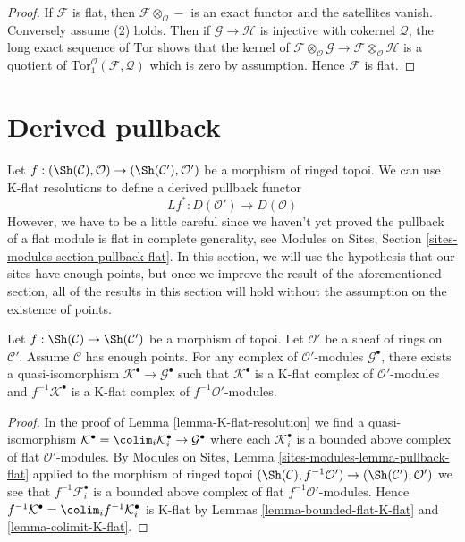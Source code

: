 \begin{proof}
If $\mathcal{F}$ is flat, then $\mathcal{F} \otimes_\mathcal{O} -$
is an exact functor and the satellites vanish. Conversely assume (2)
holds. Then if $\mathcal{G} \to \mathcal{H}$ is injective with cokernel
$\mathcal{Q}$, the long exact sequence of $\text{Tor}$ shows that
the kernel of
$\mathcal{F} \otimes_\mathcal{O} \mathcal{G} \to
\mathcal{F} \otimes_\mathcal{O} \mathcal{H}$
is a quotient of
$\text{Tor}_1^\mathcal{O}(\mathcal{F}, \mathcal{Q})$
which is zero by assumption. Hence $\mathcal{F}$ is flat.
\end{proof}












\section{Derived pullback}
\label{section-derived-pullback}

\noindent
Let
$f : (\Sh(\mathcal{C}), \mathcal{O}) \to
(\Sh(\mathcal{C}'), \mathcal{O}')$
be a morphism of ringed topoi. We can use K-flat resolutions to define
a derived pullback functor
$$
Lf^* : D(\mathcal{O}') \to D(\mathcal{O})
$$
However, we have to be a little careful since we haven't yet proved
the pullback of a flat module is flat in complete generality, see
Modules on Sites, Section \ref{sites-modules-section-pullback-flat}.
In this section, we will use the hypothesis that our
sites have enough points, but once we improve the result of the
aforementioned section, all of the results in this section will
hold without the assumption on the existence of points.

\begin{lemma}
\label{lemma-pullback-K-flat}
Let $f : \Sh(\mathcal{C}) \to \Sh(\mathcal{C}')$
be a morphism of topoi. Let $\mathcal{O}'$ be a sheaf of rings on
$\mathcal{C}'$.
Assume $\mathcal{C}$ has enough points.
For any complex of $\mathcal{O}'$-modules $\mathcal{G}^\bullet$, there
exists a quasi-isomorphism $\mathcal{K}^\bullet \to \mathcal{G}^\bullet$
such that $\mathcal{K}^\bullet$ is a K-flat complex of $\mathcal{O}'$-modules
and $f^{-1}\mathcal{K}^\bullet$ is a K-flat complex of
$f^{-1}\mathcal{O}'$-modules.
\end{lemma}

\begin{proof}
In the proof of
Lemma \ref{lemma-K-flat-resolution}
we find a quasi-isomorphism
$\mathcal{K}^\bullet = \colim_i \mathcal{K}_i^\bullet \to
\mathcal{G}^\bullet$
where each $\mathcal{K}_i^\bullet$ is a bounded above complex of
flat $\mathcal{O}'$-modules. By
Modules on Sites, Lemma \ref{sites-modules-lemma-pullback-flat}
applied to the morphism of ringed topoi
$(\Sh(\mathcal{C}), f^{-1}\mathcal{O}')
\to (\Sh(\mathcal{C}'), \mathcal{O}')$
we see that $f^{-1}\mathcal{F}_i^\bullet$ is a bounded above complex
of flat $f^{-1}\mathcal{O}'$-modules. Hence
$f^{-1}\mathcal{K}^\bullet  = \colim_i f^{-1}\mathcal{K}_i^\bullet$
is K-flat by
Lemmas \ref{lemma-bounded-flat-K-flat} and \ref{lemma-colimit-K-flat}.
\end{proof}

